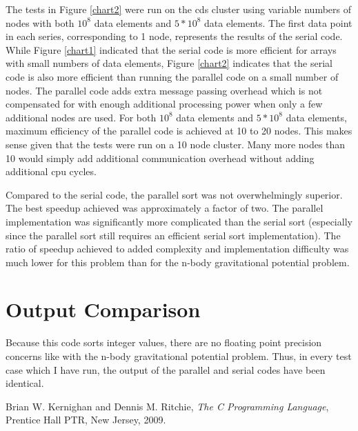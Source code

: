 \documentclass{article}
\begin{document}
The tests in Figure \ref{chart2} were run on the cds cluster using variable numbers of nodes with both \(10^8\) data elements and \(5*10^8\) data elements. The first data point in each series, corresponding to 1 node, represents the results of the serial code. While Figure \ref{chart1} indicated that the serial code is more efficient for arrays with small numbers of data elements, Figure \ref{chart2} indicates that the serial code is also more efficient than running the parallel code on a small number of nodes. The parallel code adds extra message passing overhead which is not compensated for with enough additional processing power when only a few additional nodes are used. For both \(10^8\) data elements and \(5*10^8\) data elements, maximum efficiency of the parallel code is achieved at 10 to 20 nodes. This makes sense given that the tests were run on a 10 node cluster. Many more nodes than 10 would simply add additional communication overhead without adding additional cpu cycles.

Compared to the serial code, the parallel sort was not overwhelmingly superior. The best speedup achieved was approximately a factor of two. The parallel implementation was significantly more complicated than the serial sort (especially since the parallel sort still requires an efficient serial sort implementation). The ratio of speedup achieved to added complexity and implementation difficulty was much lower for this problem than for the n-body gravitational potential problem.


\section{Output Comparison}
\label{outputcomp}

Because this code sorts integer values, there are no floating point precision concerns like with the n-body gravitational potential problem. Thus, in every test case which I have run, the output of the parallel and serial codes have been identical.

\begin{thebibliography}{9}

  Brian W. Kernighan and Dennis M. Ritchie,
  \emph{The C Programming Language},
  Prentice Hall PTR, New Jersey,
  2009.

\end{thebibliography}
\end{document}
